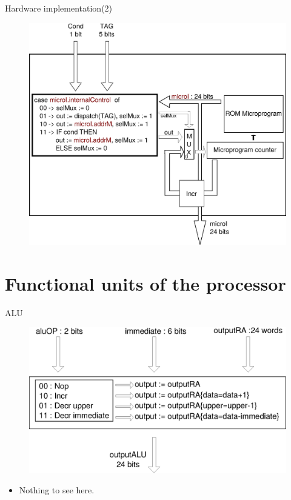 \documentclass{beamer}
\begin{document}
\begin{frame}{Hardware implementation(2)}
\begin{figure}[h]
\center
\includegraphics[scale=0.40]{control.eps}
\end{figure}
\end{frame}

\section{Functional units of the processor}
\begin{frame}{ALU}
\begin{figure}[h]
\center
\includegraphics[scale=0.40]{ALU.eps}
\end{figure}
\pause
\begin{itemize}
\item Nothing to see here.
\end{itemize}
\end{frame}
\end{document}
